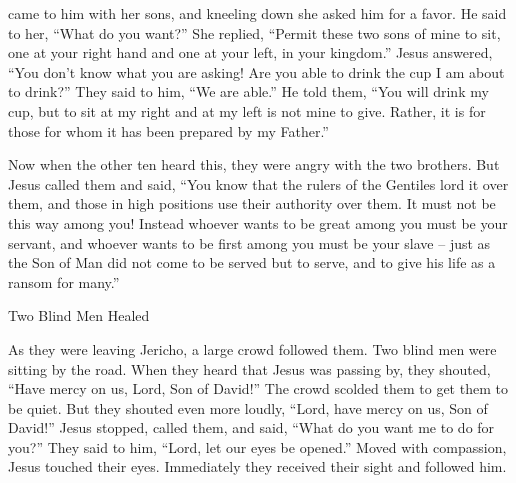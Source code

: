 {came
to him
with
her
sons,
and kneeling down
she asked
him
for a favor.
He said
to her,
“What
do you want?” She replied, “Permit these
two
sons
of mine
to sit,
one
at
your right hand
and
one
at
your
left,
in
your
kingdom.”
Jesus
answered,
“You
don’t
know
what
you are asking! Are you able
to drink
the cup
I
am about
to drink?” They said
to him,
“We are able.”
He told
them,
“You will drink
my
cup,
but
to sit
at
my
right
and at
my left
is
not
mine
to give.
Rather,
it is for those for whom
it has been prepared
by
my
Father.”
\par }{\PP {}Now when the other ten
heard
this, they were angry
with
the two
brothers.
But
Jesus
called
them
and said,
“You know
that
the rulers
of the Gentiles
lord it over
them,
and
those in high positions
use their authority
over them.
It must not
be
this way
among
you! Instead
whoever
wants
to be
great
among
you
must be
your
servant,
and
whoever
wants
to be
first
among
you
must be
your
slave –
just as
the Son
of Man
did
not
come
to be served
but
to serve,
and
to give
his
life
as a ransom
for
many.”
\par }{\SH Two Blind Men Healed
\par }{\PP {}As
they
were leaving
Jericho,
a
large
crowd
followed
them.
Two
blind men
were sitting
by
the road.
When
they heard
that
Jesus
was passing by,
they shouted, “Have mercy
on us,
Lord,
Son
of David!”
The crowd
scolded
them
to get
them to be quiet.
But
they shouted
even more loudly,
“Lord,
have mercy
on us,
Son
of David!”
Jesus
stopped,
called
them,
and
said,
“What
do you want
me to do
for you?”
They said
to him,
“Lord,
let
our
eyes
be opened.”
Moved with compassion,
Jesus
touched
their
eyes.
Immediately
they received
their sight
and
followed
him.

}
